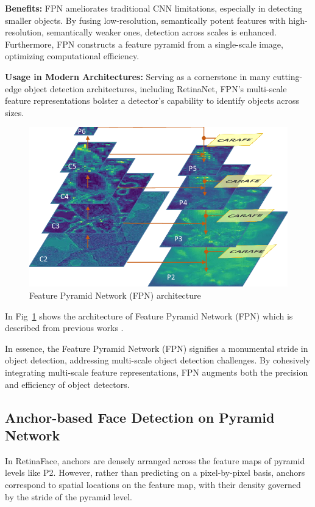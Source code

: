 \documentclass{article}
\begin{document}
\textbf{Benefits:} FPN ameliorates traditional CNN limitations, especially in detecting smaller objects. By fusing low-resolution, semantically potent features with high-resolution, semantically weaker ones, detection across scales is enhanced. Furthermore, FPN constructs a feature pyramid from a single-scale image, optimizing computational efficiency.

\textbf{Usage in Modern Architectures:} Serving as a cornerstone in many cutting-edge object detection architectures, including RetinaNet, FPN's multi-scale feature representations bolster a detector's capability to identify objects across sizes.


\begin{figure}[h]
  \centering
  \includegraphics[width=0.7\linewidth]{images/fpn}
  \caption{Feature Pyramid Network (FPN) architecture}
  \label{fig:fpn}
\end{figure}

In Fig~\ref{fig:fpn} shows the architecture of Feature Pyramid Network (FPN) which is described from previous works \cite{wang2019carafe}.

In essence, the Feature Pyramid Network (FPN) signifies a monumental stride in object detection, addressing multi-scale object detection challenges. By cohesively integrating multi-scale feature representations, FPN augments both the precision and efficiency of object detectors.


\subsection{Anchor-based Face Detection on Pyramid Network}

In RetinaFace, anchors are densely arranged across the feature maps of pyramid levels like P2. However, rather than predicting on a pixel-by-pixel basis, anchors correspond to spatial locations on the feature map, with their density governed by the stride of the pyramid level.
\end{document}
